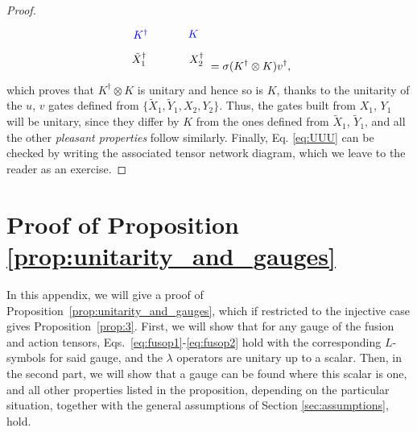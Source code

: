\documentclass[reprint,
superscriptaddress,
amsmath,amssymb,
notitlepage,
aps,
prb,
10pt, 
tightenlines
]{revtex4-2}
\begin{document}
\begin{proof}
\begin{equation}
\begin{tikzpicture}
    \node[blue] at (\dx+0.2, \dy+0.2) {$K$};
    \node[blue] at (-\dx-0.25, \dy+0.2) {$K^\dagger$};
    \node[] at (\dx +0.3, 0) {$X_2^\dagger$};
    \node[] at (-\dx -0.3, 0) {$\tilde X_1^\dagger$};
    \end{tikzpicture}
    =\sigma (K^\dagger\otimes K)v^\dagger,
\end{equation}
which proves that $K^\dagger\otimes K$ is unitary and hence so is $K$, thanks to the unitarity of the $u$, $v$ gates defined from $\{\tilde X_1, \tilde Y_1, X_2, Y_2\}$. Thus, the gates built from $X_1$, $Y_1$ will be unitary, since they differ by $K$ from the ones defined from $\tilde X_1$, $\tilde Y_1$, and all the other {\it pleasant properties} follow similarly. Finally, Eq. \eqref{eq:UUU} can be checked by writing the associated tensor network diagram, which we leave to the reader as an exercise.
\end{proof}

\section{Proof of Proposition \ref{prop:unitarity_and_gauges}}
\label{app:proofprops}

In this appendix, we will give a proof of Proposition~\ref{prop:unitarity_and_gauges}, which if restricted to the injective case gives Proposition~\ref{prop:3}. First, we will show that for any gauge of the fusion and action tensors, Eqs.~\eqref{eq:fusop1}-\eqref{eq:fusop2} hold with the corresponding $L$-symbols for said gauge, and the $\lambda$ operators are unitary up to a scalar. Then, in the second part, we will show that a gauge can be found where this scalar is one, and all other properties listed in the proposition, depending on the particular situation, together with the general assumptions of Section \ref{sec:assumptions}, hold.
\end{document}
